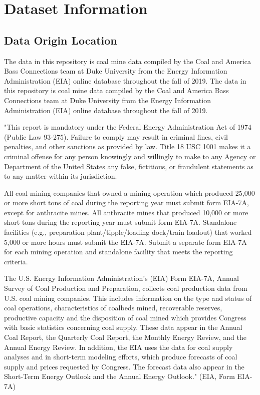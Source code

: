 \documentclass[12pt,]{article}
\begin{document}
\newpage

\hypertarget{dataset-information}{%
\section{Dataset Information}\label{dataset-information}}

\hypertarget{data-origin-location}{%
\subsection{Data Origin Location}\label{data-origin-location}}

The data in this repository is coal mine data compiled by the Coal and
America Bass Connections team at Duke University from the Energy
Information Administration (EIA) online database throughout the fall of
2019. The data in this repository is coal mine data compiled by the Coal
and America Bass Connections team at Duke University from the Energy
Information Administration (EIA) online database throughout the fall of
2019.

"This report is mandatory under the Federal Energy Administration Act of
1974 (Public Law 93-275). Failure to comply may result in criminal
fines, civil penalties, and other sanctions as provided by law. Title 18
USC 1001 makes it a criminal offense for any person knowingly and
willingly to make to any Agency or Department of the United States any
false, fictitious, or fraudulent statements as to any matter within its
jurisdiction.

All coal mining companies that owned a mining operation which produced
25,000 or more short tons of coal during the reporting year must submit
form EIA-7A, except for anthracite mines. All anthracite mines that
produced 10,000 or more short tons during the reporting year must submit
form EIA-7A. Standalone facilities (e.g., preparation
plant/tipple/loading dock/train loadout) that worked 5,000 or more hours
must submit the EIA-7A. Submit a separate form EIA-7A for each mining
operation and standalone facility that meets the reporting criteria.

The U.S. Energy Information Administration's (EIA) Form EIA-7A, Annual
Survey of Coal Production and Preparation, collects coal production data
from U.S. coal mining companies. This includes information on the type
and status of coal operations, characteristics of coalbeds mined,
recoverable reserves, productive capacity and the disposition of coal
mined which provides Congress with basic statistics concerning coal
supply. These data appear in the Annual Coal Report, the Quarterly Coal
Report, the Monthly Energy Review, and the Annual Energy Review. In
addition, the EIA uses the data for coal supply analyses and in
short-term modeling efforts, which produce forecasts of coal supply and
prices requested by Congress. The forecast data also appear in the
Short-Term Energy Outlook and the Annual Energy Outlook." (EIA, Form
EIA-7A)
\end{document}
